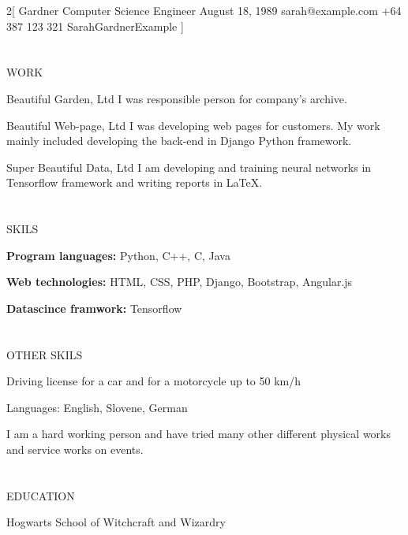 \documentclass{my_cv}
\begin{document}
\begin{multicols}{2}[
        {Gardner}%
        {Computer Science Engineer}%
        {August 18, 1989}%
        {sarah@example.com}%
        {+64 387 123 321}%
        {SarahGardnerExample}
]

\section{\faPencil}{WORK}

%
    {Beautiful Garden, Ltd}%
    {I was responsible person for company’s archive.}

%
    {Beautiful Web-page, Ltd}%
    {I was developing web pages for customers. My work mainly included developing the back-end in Django Python framework.}
     
%
    {Super Beautiful Data, Ltd}%
    {I am developing and training neural networks in Tensorflow framework and writing reports in LaTeX.}
    
\section{\faFileText}{SKILS}

\textbf{Program languages:} Python, C++, C, Java

\noindent\textbf{Web technologies:} HTML, CSS, PHP,
Django, Bootstrap, Angular.js

\noindent\textbf{Datascince framwork:} Tensorflow

\section{\faFileText}{OTHER SKILS}

Driving license for a car and for a motorcycle
up to 50 km/h

\noindent Languages: English, Slovene, German

\noindent I am a hard working person and have tried
many other different physical works and
service works on events.

\columnbreak

\section{\faGraduationCap}{EDUCATION}

%
    {Hogwarts School of Witchcraft and Wizardry}
    

\end{multicols}
\end{document}
